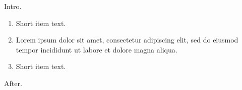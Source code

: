 \documentclass[11pt]{article}
\begin{document}
Intro.
\begin{enumerate}[noitemsep]
\item Short item text.
\item Lorem ipsum dolor sit amet, consectetur adipiscing elit, sed do eiusmod tempor incididunt ut labore et dolore magna aliqua.
\item Short item text.
\end{enumerate}
After.
\end{document}
